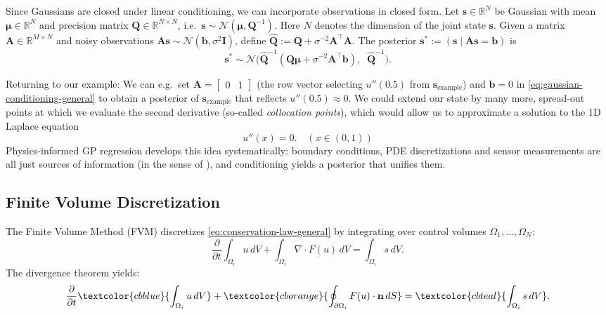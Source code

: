\documentclass{article}
\theoremstyle{plain}
\theoremstyle{definition}
\theoremstyle{remark}
\newcommand{\termaccum}[1]{\textcolor{cbblue}{#1}}
\newcommand{\termflux}[1]{\textcolor{cborange}{#1}}
\newcommand{\termsource}[1]{\textcolor{cbteal}{#1}}
\newcommand{\R}{\mathbb{R}}
\newcommand{\Rn}{\mathbb{R}^N}
\newcommand{\Rnn}{\mathbb{R}^{N \times N}}
\newcommand{\Normal}{\mathcal{N}}
\newcommand{\bmu}{\boldsymbol{\mu}}
\begin{document}
Since Gaussians are closed under linear conditioning, we can incorporate observations in closed form.
Let $\bm{s} \in \Rn$ be Gaussian with mean $\bmu \in \Rn$ and precision matrix $\bm{Q} \in \Rnn$, i.e.\ $\bm{s} \sim \Normal(\bmu, \bm{Q}^{-1})$. Here $N$ denotes the dimension of the joint state $\bm{s}$.
Given a matrix $\bm{A} \in \R^{M \times N}$ and noisy observations $\bm{A} \bm{s} \sim \Normal(\bm{b}, \sigma^2 \bm{I})$, define $\bm{\hat{Q}} := \bm{Q} + \sigma^{-2} \bm{A}^\top \bm{A}$. The posterior $\bm{s}^* := (\bm{s} \mid \bm{A}\bm{s} = \bm{b})$ is
\begin{equation}
  \bm{s}^* \sim \Normal\bigl(\bm{\hat{Q}}^{-1}(\bm{Q} \bmu + \sigma^{-2} \bm{A}^\top \bm{b}), \;\; \bm{\hat{Q}}^{-1}\bigr).
  \label{eq:gaussian-conditioning-general}
\end{equation}

Returning to our example:
We can e.g.\ set $\bm{A} = \begin{bmatrix}0 & 1\end{bmatrix}$ (the row vector selecting $u''(0.5)$ from $\bm{s}_{\text{example}}$) and $\bm{b} = 0$ in \cref{eq:gaussian-conditioning-general} to obtain a posterior of $\bm{s}_{\text{example}}$ that reflects $u''(0.5) \approx 0$.
We could extend our state by many more, spread-out points at which we evaluate the second derivative (so-called \textit{collocation points}), which would allow us to approximate a solution to the 1D Laplace equation
\begin{equation}
  u''(x) = 0. \quad (x \in (0, 1))
\end{equation}
Physics-informed GP regression \citep{pfortnerPhysicsInformedGaussianProcess2024} develops this idea systematically: boundary conditions, PDE discretizations and sensor measurements are all just sources of information (in the sense of \citet{cockayneBayesianProbabilisticNumerical2019b}), and conditioning yields a posterior that unifies them.

\subsection{Finite Volume Discretization}
\label{sec:fvm-discretization}
The Finite Volume Method (FVM) discretizes \cref{eq:conservation-law-general} by integrating over control volumes $\Omega_1, \dots, \Omega_N$:
\begin{equation}
  \frac{\partial}{\partial t} \int_{\Omega_i} u \, dV + \int_{\Omega_i} \nabla \cdot F(u)  \, dV = \int_{\Omega_i} s \, dV .
  \label{eq:conservation-law-integrated}
\end{equation}
The divergence theorem yields:
\begin{equation}
  \frac{\partial}{\partial t} \termaccum{\int_{\Omega_i} u \, dV} + \termflux{\oint_{\partial\Omega_i} F(u) \cdot \mathbf{n} \, dS} = \termsource{\int_{\Omega_i} s \, dV} .
  \label{eq:conservation-law}
\end{equation}
\end{document}
